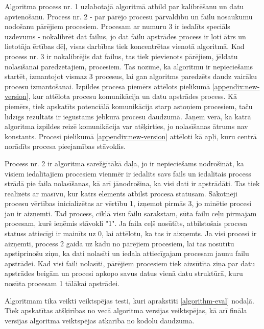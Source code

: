 Algoritma process nr. 1 uzlabotajā algoritmā atbild par kalibrēšanu un datu apvienošanu. Process nr. 2 - par pārējo procesu pārvaldību un failu nosaukumu nodošanu pārējiem procesiem. Procesam ar numuru 3 ir iedalīts speciāls uzdevums - nokalibrēt dat failus, jo dat failu apstrādes process ir ļoti ātrs un lietotāja ērtības dēļ, visas darbības tiek koncentrētas vienotā algoritmā. Kad process nr. 3 ir nokalibrējis dat failus, tas tiek pievienots pārējiem, jēldatu nolasīšanai paredzētajiem, procesiem. Tas nozīmē, ka algoritmu ir nepieciešams startēt, izmantojot vismaz 3 procesus, lai gan algoritms paredzēts daudz vairāku procesu izmantošanai. Izpildes procesa piemērs attēlots pielikumā \ref{appendix:new-version}, kur attēlota procesu komunikācija un datu apstrādes process. Kā piemērs, tiek apskatīts potenciālā komunikācija starp astoņiem procesiem, taču līdzīgs rezultāts ir iegūstams jebkurā procesu daudzumā. Jāņem vērā, ka katrā algoritma izpildes reizē komunikācija var atšķirties, jo nolasīšanas ātrums nav konstants. Procesi pielikumā \ref{appendix:new-version} attēloti kā apļi, kuru centrā norādīts procesa pieejamības stāvoklis.

Process nr. 2 ir algoritma sarežģītākā daļa, jo ir nepieciešams nodrošināt, ka visiem iedalītajiem procesiem vienmēr ir iedalīts savs fails un iedalītais process strādā pie faila nolasīšanas, kā arī jānodrošina, ka visi dati ir apstrādāti. Tas tiek realizēts ar masīvu, kur katrs elements atbilst procesa statusam. Sākotnēji procesu vērtības inicializētas ar vērtību 1, izņemot pirmās 3, jo minētie procesi jau ir aizņemti.
Tad process, ciklā visu failu sarakstam, sūta failu ceļu pirmajam procesam, kurš ieņēmis stāvokli "1". Ja faila ceļš nosūtīts, atbilstošais procesa statuss attiecīgi ir mainīts uz 0, lai attēlotu, ka tas ir aizņemts. Ja visi procesi ir aizņemti, process 2 gaida uz kādu no pārējiem procesiem, lai tas nosūtītu apstiprinošu ziņu, ka dati nolasīti un iedala attiecīgajam procesam jaunu failu apstrādei. Kad visi faili nolasīti, pārējiem procesiem tiek aizsūtīta ziņa par datu apstrādes beigām un procesi apkopo savus datus vienā datu struktūrā, kuru nosūta procesam 1 tālākai apstrādei.  

Algoritmam tika veikti veiktspējas testi, kuri aprakstīti \ref{algorithm-eval} nodaļā. Tiek apskatītas atšķirības no vecā algoritma versijas veiktspējas, kā arī fināla versijas algoritma veiktspējas atkarība no kodolu daudzuma.






